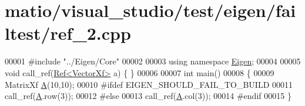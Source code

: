 \hypertarget{matio_2visual__studio_2test_2eigen_2failtest_2ref__2_8cpp_source}{}\section{matio/visual\+\_\+studio/test/eigen/failtest/ref\+\_\+2.cpp}
\label{matio_2visual__studio_2test_2eigen_2failtest_2ref__2_8cpp_source}

\begin{DoxyCode}
00001 \textcolor{preprocessor}{#include "../Eigen/Core"}
00002 
00003 \textcolor{keyword}{using namespace }\hyperlink{namespace_eigen}{Eigen};
00004 
00005 \textcolor{keywordtype}{void} call\_ref(\hyperlink{group___core___module_class_eigen_1_1_ref}{Ref<VectorXf>} a) \{ \}
00006 
00007 \textcolor{keywordtype}{int} main()
00008 \{
00009   MatrixXf \hyperlink{group___core___module_class_eigen_1_1_matrix}{A}(10,10);
00010 \textcolor{preprocessor}{#ifdef EIGEN\_SHOULD\_FAIL\_TO\_BUILD}
00011   call\_ref(\hyperlink{group___core___module_class_eigen_1_1_matrix}{A}.row(3));
00012 \textcolor{preprocessor}{#else}
00013   call\_ref(\hyperlink{group___core___module_class_eigen_1_1_matrix}{A}.col(3));
00014 \textcolor{preprocessor}{#endif}
00015 \}
\end{DoxyCode}
